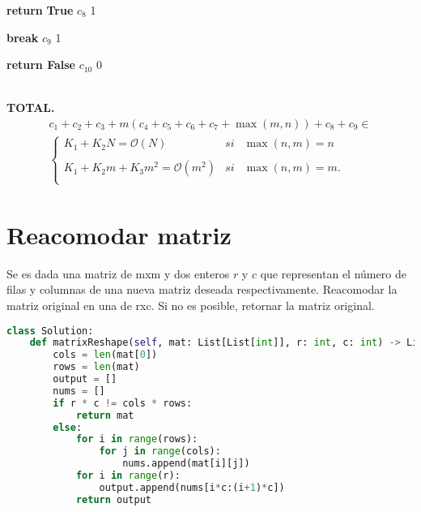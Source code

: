 \documentclass{article}
\newcommand{\bigO}{\mathcal{O}} %
\begin{document}
\begin{algorithm}
\begin{algorithmic}
                    \item \hspace{1.9cm} \textbf{return}  \textbf{True} \hspace{5.25cm} $c_8$ \hspace{1.1cm} 1
                \item \hspace{1.6cm} \textbf{break} \hspace{6.6cm} $c_9$ \hspace{1.1cm} 1
        \item \hspace{0.7cm} \textbf{return False} \hspace{6.3cm} $c_{10}$ \hspace{1.1cm} 0 \\
\end{algorithmic} 
\end{algorithm} \\
\textbf{TOTAL.} 
\begin{align*}
    c_1 + c_2 + c_3 + m(c_4+c_5+c_6+c_7+\max(m,n)) + c_8+c_9 \in
   \\
    \left\{ \begin{array}{lcc}
             K_1+K_2N = \bigO(N) &   si  & \max(n,m) = n \\
             \\ K_1+K_2m+K_3m^2 = \bigO(m^2) &  si & \max(n,m) = m. \\
             \end{array}
   \right.
\end{align*}


\newpage
\section*{Reacomodar matriz}
Se es dada una matriz de mxm y dos enteros $r$ y $c$ que representan el número de filas y columnas de una nueva matriz deseada respectivamente. Reacomodar la matriz original en una de rxc. Si no es posible, retornar la matriz original. 

\begin{lstlisting}[language=Python]
class Solution:
    def matrixReshape(self, mat: List[List[int]], r: int, c: int) -> List[List[int]]:
        cols = len(mat[0])
        rows = len(mat)
        output = []
        nums = []
        if r * c != cols * rows:
            return mat
        else:
            for i in range(rows):
                for j in range(cols):
                    nums.append(mat[i][j])
            for i in range(r):
                output.append(nums[i*c:(i+1)*c])
            return output
\end{lstlisting}
\vspace{0.5cm}
\end{document}
